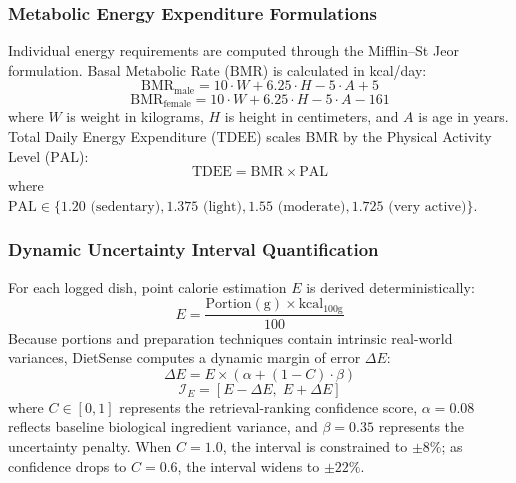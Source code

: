 \documentclass[conference]{IEEEtran}
\begin{document}
\subsubsection{Metabolic Energy Expenditure Formulations}
Individual energy requirements are computed through the Mifflin--St Jeor formulation. Basal Metabolic Rate ($\text{BMR}$) is calculated in kcal/day:
\begin{equation}
\text{BMR}_{\text{male}} = 10 \cdot W + 6.25 \cdot H - 5 \cdot A + 5
\label{eq:bmr_male}
\end{equation}
\begin{equation}
\text{BMR}_{\text{female}} = 10 \cdot W + 6.25 \cdot H - 5 \cdot A - 161
\label{eq:bmr_female}
\end{equation}
where $W$ is weight in kilograms, $H$ is height in centimeters, and $A$ is age in years. Total Daily Energy Expenditure ($\text{TDEE}$) scales BMR by the Physical Activity Level ($\text{PAL}$):
\begin{equation}
\text{TDEE} = \text{BMR} \times \text{PAL}
\label{eq:tdee}
\end{equation}
where $\text{PAL} \in \{1.20 \text{ (sedentary)}, 1.375 \text{ (light)}, 1.55 \text{ (moderate)}, 1.725 \text{ (very active)}\}$.

\subsubsection{Dynamic Uncertainty Interval Quantification}
For each logged dish, point calorie estimation $E$ is derived deterministically:
\begin{equation}
E = \frac{\text{Portion}(\text{g}) \times \text{kcal}_{100\text{g}}}{100}
\label{eq:calorie_point}
\end{equation}
Because portions and preparation techniques contain intrinsic real-world variances, DietSense computes a dynamic margin of error $\Delta E$:
\begin{equation}
\Delta E = E \times \left( \alpha + (1 - C) \cdot \beta \right)
\label{eq:margin}
\end{equation}
\begin{equation}
\mathcal{I}_{E} = \left[ E - \Delta E, \; E + \Delta E \right]
\label{eq:interval}
\end{equation}
where $C \in [0, 1]$ represents the retrieval-ranking confidence score, $\alpha = 0.08$ reflects baseline biological ingredient variance, and $\beta = 0.35$ represents the uncertainty penalty. When $C=1.0$, the interval is constrained to $\pm 8\%$; as confidence drops to $C=0.6$, the interval widens to $\pm 22\%$.
\end{document}
